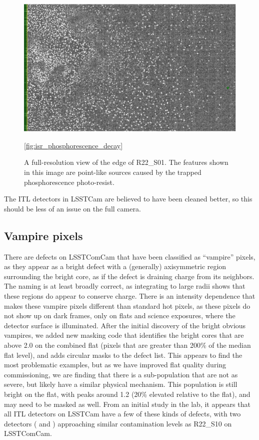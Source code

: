 \begin{figure}
  \includegraphics{figures/isr-f02-phosphorescence_point_like.jpg}
  \caption{A full-resolution view of the edge of R22_S01.  The features shown in this image are point-like sources caused by the trapped phosphorescence photo-resist.}
  \ref{fig:isr_phosphorescence_decay}
\end{figure}

The ITL detectors in LSSTCam are believed to have been cleaned better, so this should be less of an issue on the full camera.

\subsection{Vampire pixels}

There are defects on LSSTComCam that have been classified as ``vampire'' pixels, as they appear as a bright defect with a (generally) axisymmetric region surrounding the bright core, as if the defect is draining charge from its neighbors.
The naming is at least broadly correct, as integrating to large radii shows that these regions do appear to conserve charge.
There is an intensity dependence that makes these vampire pixels different than standard hot pixels, as these pixels do not show up on dark frames, only on flats and science exposures, where the detector surface is illuminated.
After the initial discovery of the bright obvious vampires, we added new masking code that identifies the bright cores that are above 2.0 on the combined flat (pixels that are greater than 200\% of the median flat level), and adds circular masks to the defect list.
This appears to find the most problematic examples, but as we have improved flat quality during commissioning, we are finding that there is a sub-population that are not as severe, but likely have a similar physical mechanism.
This population is still bright on the flat, with peaks around 1.2 (20\% elevated relative to the flat), and may need to be masked as well.
From an initial study in the lab, it appears that all ITL detectors on LSSTCam have a few of these kinds of defects, with two detectors ( and ) approaching similar contamination levels as R22_S10 on LSSTComCam.


